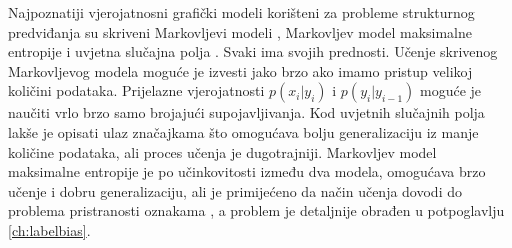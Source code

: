 Najpoznatiji vjerojatnosni grafički modeli korišteni za probleme strukturnog
predviđanja su skriveni Markovljevi modeli ,
Markovljev model maksimalne entropije  i
uvjetna slučajna polja . Svaki ima svojih
prednosti. Učenje skrivenog Markovljevog modela moguće je izvesti jako brzo ako
imamo pristup velikoj količini podataka. Prijelazne vjerojatnosti $p(x_i | y_i)$
i $p(y_i | y_{i-1})$ moguće je naučiti vrlo brzo samo brojajući supojavljivanja.
Kod uvjetnih slučajnih polja lakše je opisati ulaz značajkama što omogućava
bolju generalizaciju iz manje količine podataka, ali proces učenja je
dugotrajniji. Markovljev model maksimalne entropije je po učinkovitosti između
dva modela, omogućava brzo učenje i dobru generalizaciju, ali je primijećeno da
način učenja dovodi do problema pristranosti oznakama 
\citep{lafferty2001conditional}, a problem je detaljnije obrađen u potpoglavlju
\ref{ch:labelbias}.

